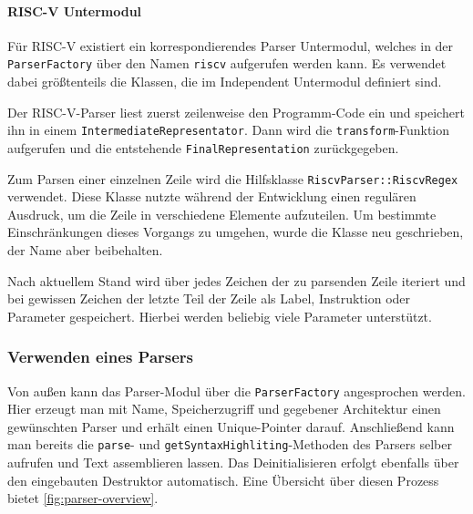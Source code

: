 \pagebreak
\paragraph{RISC-V Untermodul}

Für RISC-V existiert ein korrespondierendes Parser Untermodul, welches in der
\texttt{ParserFactory} über den Namen \texttt{riscv} aufgerufen werden kann. Es
verwendet dabei größtenteils die Klassen, die im Independent Untermodul definiert
sind.

Der RISC-V-Parser liest zuerst zeilenweise den Programm-Code ein und speichert
ihn in einem \texttt{Intermediate\-Representator}. Dann wird die
\texttt{transform}-Funktion aufgerufen und die entstehende
\texttt{Final\-Representation} zurückgegeben.

Zum Parsen einer einzelnen Zeile wird die Hilfsklasse
\texttt{RiscvParser::\allowbreak{}RiscvRegex} verwendet. Diese Klasse nutzte
während der Entwicklung einen regulären Ausdruck, um die Zeile in verschiedene
Elemente aufzuteilen. Um bestimmte Einschränkungen dieses Vorgangs zu umgehen,
wurde die Klasse neu geschrieben, der Name aber beibehalten.

Nach aktuellem Stand wird über jedes Zeichen der zu parsenden Zeile iteriert und
bei gewissen Zeichen der letzte Teil der Zeile als Label, Instruktion oder
Parameter gespeichert. Hierbei werden beliebig viele Parameter unterstützt.

\subsubsection{Verwenden eines Parsers}

Von außen kann das Parser-Modul über die \texttt{ParserFactory} angesprochen
werden. Hier erzeugt man mit Name, Speicherzugriff und gegebener Architektur
einen gewünschten Parser und erhält einen Unique-Pointer darauf. Anschließend
kann man bereits die \texttt{parse}- und \texttt{getSyntaxHighliting}-Methoden
des Parsers selber aufrufen und Text assemblieren lassen. Das Deinitialisieren
erfolgt ebenfalls über den eingebauten Destruktor automatisch. Eine Übersicht
über diesen Prozess bietet \autoref{fig:parser-overview}.

